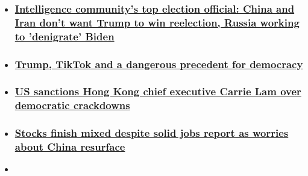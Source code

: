 \begin{itemize}
\item
  \hypertarget{intelligence-communitys-top-election-official-china-and-iran-dont-want-trump-to-win-reelection-russia-working-to-denigrate-biden}{%
  \subsubsection{\texorpdfstring{\href{/2020/08/07/politics/2020-election-russia-china-iran/index.html}{Intelligence
  community's top election official: China and Iran don't want Trump to
  win reelection, Russia working to 'denigrate'
  Biden}}{Intelligence community's top election official: China and Iran don't want Trump to win reelection, Russia working to 'denigrate' Biden}}\label{intelligence-communitys-top-election-official-china-and-iran-dont-want-trump-to-win-reelection-russia-working-to-denigrate-biden}}
\item
  \hypertarget{trump-tiktok-and-a-dangerous-precedent-for-democracy-}{%
  \subsubsection{\texorpdfstring{\href{/2020/08/08/business/trump-tiktok-democracy-intl/index.html}{Trump,
  TikTok and a dangerous precedent for democracy
  }}{Trump, TikTok and a dangerous precedent for democracy }}\label{trump-tiktok-and-a-dangerous-precedent-for-democracy-}}
\item
  \hypertarget{us-sanctions-hong-kong-chief-executive-carrie-lam-over-democratic-crackdowns}{%
  \subsubsection{\texorpdfstring{\href{/2020/08/07/politics/us-sanctions-carrie-lam/index.html}{US
  sanctions Hong Kong chief executive Carrie Lam over democratic
  crackdowns}}{US sanctions Hong Kong chief executive Carrie Lam over democratic crackdowns}}\label{us-sanctions-hong-kong-chief-executive-carrie-lam-over-democratic-crackdowns}}
\item
  \hypertarget{stocks-finish-mixed-despite-solid-jobs-report-as-worries-about-china-resurface}{%
  \subsubsection{\texorpdfstring{\href{/2020/08/07/investing/dow-stock-market-today-jobs/index.html}{Stocks
  finish mixed despite solid jobs report as worries about China
  resurface}}{Stocks finish mixed despite solid jobs report as worries about China resurface}}\label{stocks-finish-mixed-despite-solid-jobs-report-as-worries-about-china-resurface}}
\item
  \hypertarget{intelligence-communitys-top-election-officials-statement-warning-of-threats-from-china-russia-and-iran}{%
}
\end{itemize}
